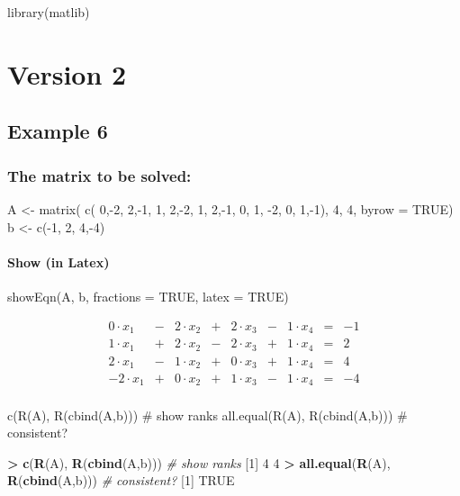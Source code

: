 \documentclass[
]{article}
\author{}
\date{\vspace{-2.5em}}
\newenvironment{Shaded}{\begin{snugshade}}{\end{snugshade}}
\newcommand{\CommentTok}[1]{\textcolor[rgb]{0.56,0.35,0.01}{\textit{#1}}}
\newcommand{\ConstantTok}[1]{\textcolor[rgb]{0.56,0.35,0.01}{#1}}
\newcommand{\DecValTok}[1]{\textcolor[rgb]{0.00,0.00,0.81}{#1}}
\newcommand{\FunctionTok}[1]{\textcolor[rgb]{0.13,0.29,0.53}{\textbf{#1}}}
\newcommand{\NormalTok}[1]{#1}
\newcommand{\SpecialCharTok}[1]{\textcolor[rgb]{0.81,0.36,0.00}{\textbf{#1}}}
\begin{document}
library(matlib)

\section{Version 2}\label{version-2}

\subsection{Example 6}\label{example-6}

\subsubsection{The matrix to be solved:}\label{the-matrix-to-be-solved}

A \textless- matrix( c( 0,-2, 2,-1, 1, 2,-2, 1, 2,-1, 0, 1, -2, 0,
1,-1), 4, 4, byrow = TRUE) b \textless- c(-1, 2, 4,-4)

\paragraph{Show (in Latex)}\label{show-in-latex}

showEqn(A, b, fractions = TRUE, latex = TRUE)

\[
\begin{array}{lllllllll}
 0 \cdot x_1 &-& 2 \cdot x_2 &+& 2 \cdot x_3 &-& 1 \cdot x_4  &=&  -1 \\ 
 1 \cdot x_1 &+& 2 \cdot x_2 &-& 2 \cdot x_3 &+& 1 \cdot x_4  &=&   2 \\ 
 2 \cdot x_1 &-& 1 \cdot x_2 &+& 0 \cdot x_3 &+& 1 \cdot x_4  &=&   4 \\ 
-2 \cdot x_1 &+& 0 \cdot x_2 &+& 1 \cdot x_3 &-& 1 \cdot x_4  &=&  -4 \\ 
\end{array}
\]

c(R(A), R(cbind(A,b))) \# show ranks all.equal(R(A), R(cbind(A,b))) \#
consistent?

\begin{Shaded}
\begin{Highlighting}[]
\SpecialCharTok{\textgreater{}} \FunctionTok{c}\NormalTok{(}\FunctionTok{R}\NormalTok{(A), }\FunctionTok{R}\NormalTok{(}\FunctionTok{cbind}\NormalTok{(A,b)))              }\CommentTok{\# show ranks}
\NormalTok{[}\DecValTok{1}\NormalTok{] }\DecValTok{4} \DecValTok{4}
\SpecialCharTok{\textgreater{}} \FunctionTok{all.equal}\NormalTok{(}\FunctionTok{R}\NormalTok{(A), }\FunctionTok{R}\NormalTok{(}\FunctionTok{cbind}\NormalTok{(A,b)))      }\CommentTok{\# consistent?}
\NormalTok{[}\DecValTok{1}\NormalTok{] }\ConstantTok{TRUE}
\end{Highlighting}
\end{Shaded}
\end{document}
